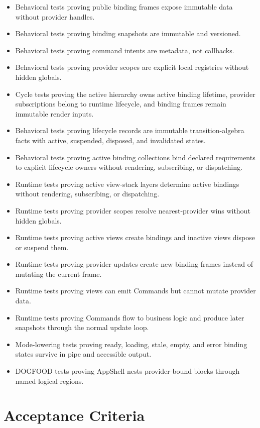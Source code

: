 \begin{itemize}
\tightlist
\item
  Behavioral tests proving public binding frames expose immutable data without provider handles.
\item
  Behavioral tests proving binding snapshots are immutable and versioned.
\item
  Behavioral tests proving command intents are metadata, not callbacks.
\item
  Behavioral tests proving provider scopes are explicit local registries without hidden globals.
\item
  Cycle tests proving the active hierarchy owns active binding lifetime, provider subscriptions belong to runtime lifecycle, and binding frames remain immutable render inputs.
\item
  Behavioral tests proving lifecycle records are immutable transition-algebra facts with active, suspended, disposed, and invalidated states.
\item
  Behavioral tests proving active binding collections bind declared requirements to explicit lifecycle owners without rendering, subscribing, or dispatching.
\item
  Runtime tests proving active view-stack layers determine active bindings without rendering, subscribing, or dispatching.
\item
  Runtime tests proving provider scopes resolve nearest-provider wins without hidden globals.
\item
  Runtime tests proving active views create bindings and inactive views dispose or suspend them.
\item
  Runtime tests proving provider updates create new binding frames instead of mutating the current frame.
\item
  Runtime tests proving views can emit Commands but cannot mutate provider data.
\item
  Runtime tests proving Commands flow to business logic and produce later snapshots through the normal update loop.
\item
  Mode-lowering tests proving ready, loading, stale, empty, and error binding states survive in pipe and accessible output.
\item
  DOGFOOD tests proving AppShell nests provider-bound blocks through named logical regions.
\end{itemize}

\section{Acceptance Criteria}\label{record-132-acceptance-criteria}

